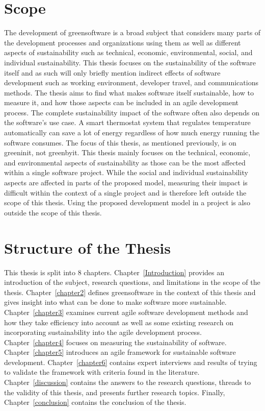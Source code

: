 \section{Scope}\label{scope}
The development of \gls{greensoftware} is a broad subject that considers many parts of the development processes and organizations using them as well as different aspects of sustainability such as technical, economic, environmental, social, and individual sustainability. This thesis focuses on the sustainability of the software itself and as such will only briefly mention indirect effects of software development such as working environment, developer travel, and communications methods. The thesis aims to find what makes software itself sustainable, how to measure it, and how those aspects can be included in an agile development process. The complete sustainability impact of the software often also depends on the software's use case. A smart thermostat system that regulates temperature automatically can save a lot of energy regardless of how much energy running the software consumes. The focus of this thesis, as mentioned previously, is on \gls{greeninit}, not \gls{greenbyit}. This thesis mainly focuses on the technical, economic, and environmental aspects of sustainability as those can be the most affected within a single software project. While the social and individual sustainability aspects are affected in parts of the proposed model, measuring their impact is difficult within the context of a single project and is therefore left outside the scope of this thesis. Using the proposed development model in a project is also outside the scope of this thesis.

\section{Structure of the Thesis}
This thesis is split into 8 chapters. Chapter~\ref{Introduction} provides an introduction of the subject, research questions, and limitations in the scope of the thesis. Chapter~\ref{chapter2} defines \gls{greensoftware} in the context of this thesis and gives insight into what can be done to make software more sustainable. Chapter~\ref{chapter3} examines current agile software development methods and how they take efficiency into account as well as some existing research on incorporating sustainability into the agile development process. Chapter~\ref{chapter4} focuses on measuring the sustainability of software. Chapter~\ref{chapter5} introduces an agile framework for sustainable software development. Chapter~\ref{chapter6} contains expert interviews and results of trying to validate the framework with criteria found in the literature. Chapter~\ref{discussion} contains the answers to the research questions, threads to the validity of this thesis, and presents further research topics. Finally, Chapter~\ref{conclusion} contains the conclusion of the thesis.
